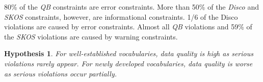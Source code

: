 \documentclass{llncs}
\newtheorem{hyp}{Hypothesis}
\begin{document}
{{80\% of the \emph{QB} constraints are error constraints.
More than 50\% of the \emph{Disco} and \emph{SKOS} constraints, however, are informational constraints.
1/6 of the Disco violations are caused by error constraints.
Almost all \emph{QB} violations and 59\% of the \emph{SKOS} violations are caused by warning constraints.  
\begin{hyp}
For well-established vocabularies, data quality is high
as serious violations rarely appear.
For newly developed vocabularies, data quality is worse
as serious violations occur partially.
\end{hyp} 


}}
\end{document}
